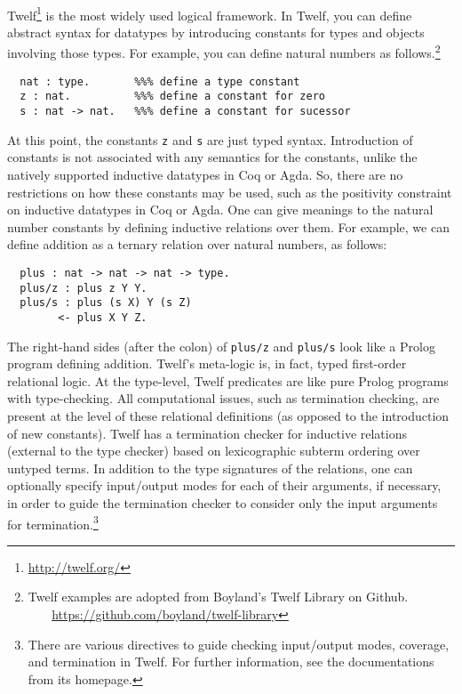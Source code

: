 \paragraph{}
Twelf\footnote{\url{http://twelf.org/}} is the most widely used
logical framework. In Twelf, you can define abstract syntax for datatypes
by introducing constants for types and objects involving those types.
For example, you can define natural numbers as follows.\footnote{
        Twelf examples are adopted from Boyland's Twelf Library on Github.\\
        $~~~~~~~$
        \url{https://github.com/boyland/twelf-library}}\vspace*{-2em}
\begin{singlespace}
\begin{verbatim}
  nat : type.       %%% define a type constant
  z : nat.          %%% define a constant for zero
  s : nat -> nat.   %%% define a constant for sucessor
\end{verbatim}
\end{singlespace}\noindent
At this point, the constants \texttt{z} and \texttt{s} are just typed syntax.
Introduction of constants is not associated with any semantics for
the constants, unlike the natively supported inductive datatypes
in Coq or Agda. So, there are no restrictions on how these constants
may be used, such as the positivity constraint on inductive datatypes
in Coq or Agda. One can give meanings to the natural number constants
by defining inductive relations over them. For example, we can define
addition as a ternary relation over natural numbers, as follows:\vspace*{-2em}
\begin{singlespace}
\begin{verbatim}
  plus : nat -> nat -> nat -> type.
  plus/z : plus z Y Y.
  plus/s : plus (s X) Y (s Z)
        <- plus X Y Z.
\end{verbatim}
\end{singlespace}\noindent
The right-hand sides (after the colon) of \verb|plus/z| and \verb|plus/s|
look like a Prolog program defining addition. Twelf's meta-logic is, in fact,
typed first-order relational logic. At the type-level, Twelf predicates are
like pure Prolog programs with type-checking. All computational issues,
such as termination checking, are present at the level of these
relational definitions (as opposed to the introduction of new constants).
Twelf has a termination checker for inductive relations (external to
the type checker) based on lexicographic subterm ordering over untyped terms.
In addition to the type signatures of the relations, one can optionally specify
input/output modes for each of their arguments, if necessary, in order to guide
the termination checker to consider only the input arguments
for termination.\footnote{There are various directives to guide
        checking input/output modes, coverage, and termination in Twelf.
        For further information, see the  documentations from its homepage.}

